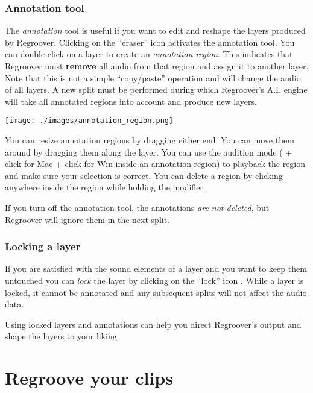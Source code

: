 \documentclass[12pt]{article}
\newcommand{\textimage}[3]{
\raisebox{#1}{\texttt{[image: \#3]}}
}
\begin{document}
\subsubsection*{Annotation tool}
The \textit{annotation} tool is useful if you want to edit and reshape the layers produced by Regroover. Clicking on the ``eraser'' icon \textimage{-8pt}{1}{./images/eraser_button.png} activates the annotation tool. You can double click on a layer to create an \textit{annotation region}. This indicates that Regroover must \textbf{remove} all audio from that region and assign it to another layer. Note that this is not a simple ``copy/paste'' operation and will change the audio of all layers. A new split must be performed during which Regroover's A.I. engine will take all annotated regions into account and produce new layers. 
\begin{center}
\texttt{[image: ./images/annotation\_region.png]}
\end{center}
You can resize annotation regions by dragging either end. You can move them around by dragging them along the layer. You can use the audition mode (\keys{\shift + \cmd} + click for Mac \keys{\shift + \ctrl} + click for Win inside an annotation region) to playback the region and make sure your selection is correct. You can delete a region by clicking anywhere inside the region while holding the \keys{\shift} modifier. 
\begin{mdframed}[style = warning]
If you turn off the annotation tool, the annotations \textit{are not deleted}, but Regroover will ignore them in the next split.
\end{mdframed}

\subsubsection*{Locking a layer}
If you are satisfied with the sound elements of a layer and you want to keep them untouched you can \textit{lock} the layer by clicking on the ``lock'' icon  \textimage{-6pt}{1}{./images/layer_lock.png} . While a layer is locked, it cannot be annotated and any subsequent splits will not affect the audio data.
\begin{mdframed}[style = tip]
Using locked layers and annotations can help you direct Regroover's output and shape the layers to your liking.
\end{mdframed}
\section*{Regroove your clips}
\end{document}
